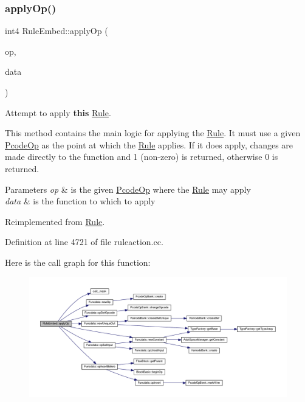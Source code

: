 \subsubsection{\texorpdfstring{applyOp()}{applyOp()}}
{\footnotesize\ttfamily int4 Rule\+Embed\+::apply\+Op (\begin{DoxyParamCaption}\item[{\mbox{\hyperlink{class_pcode_op}{Pcode\+Op}} $\ast$}]{op,  }\item[{\mbox{\hyperlink{class_funcdata}{Funcdata}} \&}]{data }\end{DoxyParamCaption})\hspace{0.3cm}{\ttfamily [virtual]}}



Attempt to apply {\bfseries{this}} \mbox{\hyperlink{class_rule}{Rule}}. 

This method contains the main logic for applying the \mbox{\hyperlink{class_rule}{Rule}}. It must use a given \mbox{\hyperlink{class_pcode_op}{Pcode\+Op}} as the point at which the \mbox{\hyperlink{class_rule}{Rule}} applies. If it does apply, changes are made directly to the function and 1 (non-\/zero) is returned, otherwise 0 is returned. 
\begin{DoxyParams}{Parameters}
{\em op} & is the given \mbox{\hyperlink{class_pcode_op}{Pcode\+Op}} where the \mbox{\hyperlink{class_rule}{Rule}} may apply \\
\hline
{\em data} & is the function to which to apply \\
\hline
\end{DoxyParams}


Reimplemented from \mbox{\hyperlink{class_rule_a4e3e61f066670175009f60fb9dc60848}{Rule}}.



Definition at line 4721 of file ruleaction.\+cc.

Here is the call graph for this function\+:
\nopagebreak
\begin{figure}[H]
\begin{center}
\leavevmode
\includegraphics[width=350pt]{class_rule_embed_abd0eb20956c404ec4abcb2776c593086_cgraph}
\end{center}
\end{figure}
\mbox{\label{class_rule_embed_a665557b4d2e8b6dead6e209a819ea134}} 
